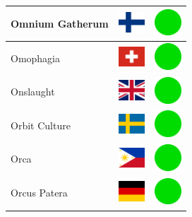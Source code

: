 \documentclass[12pt, a4paper, twoside]{report}
\begin{document}
\begin{center}
\begin{longtable}{|p{5cm}|p{2cm}|p{2cm}|}
Omnium Gatherum & \includegraphics[width=1cm]{4x3/fi} & \includegraphics[width=1cm]{likes/y} \\ \hline
Omophagia & \includegraphics[width=1cm]{4x3/ch} & \includegraphics[width=1cm]{likes/y} \\ \hline
Onslaught & \includegraphics[width=1cm]{4x3/gb} & \includegraphics[width=1cm]{likes/y} \\ \hline
Orbit Culture & \includegraphics[width=1cm]{4x3/se} & \includegraphics[width=1cm]{likes/y} \\ \hline
Orca & \includegraphics[width=1cm]{4x3/ph} & \includegraphics[width=1cm]{likes/y} \\ \hline
Orcus Patera & \includegraphics[width=1cm]{4x3/de} & \includegraphics[width=1cm]{likes/y} \\ \hline

\end{longtable}
\end{center}
\end{document}
